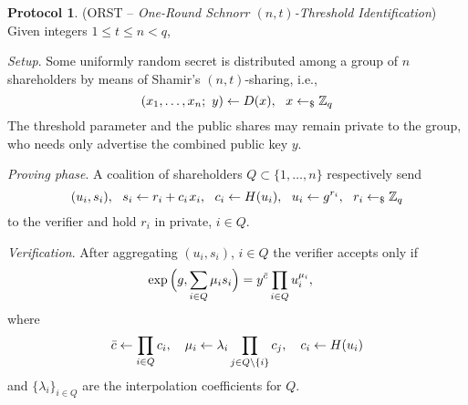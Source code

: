 \documentclass[psamsfonts, reqno]{amsart}
\theoremstyle{definition}
\newtheorem{protocol}[thm]{Protocol}
\theoremstyle{remark}
\numberwithin{equation}{section}
\begin{document}
\begin{protocol}\label{orst_protocol}
(\textsf{ORST} -- \textit{One-Round Schnorr $(n, t)$-Threshold Identification})
Given integers $1 \le t \le n < q$,
\enumerate[label=$\circ$, leftmargin=17pt]
\vspace{5pt}
\item \textit{Setup}. Some uniformly random secret is
distributed among a group of $n$ shareholders
by means of Shamir's $(n, t)$-sharing, i.e.,
\vspace{5pt}
\begin{equation*}\label{orst_sharing}
(x_1, \dots, x_n;\ y) \leftarrow D(x),
\ \ x \leftarrow_\$ \mathbb{Z}_q
\vspace{5pt}
\end{equation*}
The threshold parameter and the public shares may remain private to the group,
who needs only advertise the combined public key $y$.
\vspace{5pt}
\item \textit{Proving phase}. A coalition of shareholders
$Q \subset \{1, \dots, n\}$ respectively send
\vspace{5pt}
\begin{equation*}
(u_i, s_i),
\ \ s_i \leftarrow r_i + c_i\hspace{1pt} x_i,
\ \ c_i \leftarrow H(u_i),
\ \ u_i \leftarrow g ^ {r_i},
\ \ r_i \leftarrow_\$ \mathbb{Z}_q
\vspace{5pt}
\end{equation*}
to the verifier and hold $r_i$ in private, $i \in Q$.
\vspace{5pt}
\item \textit{Verification}.
After aggregating $(u_i, s_i)$, $i \in Q$
the verifier accepts only if
\vspace{6pt}
\begin{equation}\label{orst_verification}
\begin{split}
\exp\Big(g, \sum_{i \in Q} \mu_i s_i\Big) &=
y^{\bar{c}} \prod_{i \in Q} u_i ^ {\mu_i},
\end{split}
\vspace{-3pt}
\end{equation}
where
\vspace{2pt}
\begin{equation}\label{orst_aliases}
\bar{c} \leftarrow \prod_{i \in Q} c_i,
\ \ \  \mu_i \leftarrow \lambda_i \prod_{j \in Q \setminus \{i\}} c_j,
\ \ \  c_i \leftarrow H(u_i)
\vspace{8pt}
\end{equation}
and $\{\lambda_i\}_{i \in Q }$ are the interpolation coefficients
for $Q$.
\end{protocol}
\end{document}
